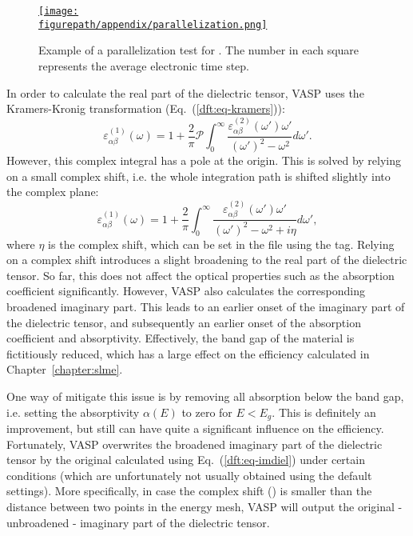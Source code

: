 \begin{refsection}
\begin{figure}[ht]
\centering
\href{https://www.youtube.com/watch?v=q8rcTvAoRzk}{
\texttt{[image: \\figurepath/appendix/parallelization.png]}
}
\caption{Example of a parallelization test for . The number in each 
square represents the average electronic time step.}
\label{appendix:fig-parallelization}
\end{figure}
 
\pagebreak[4]

In order to calculate the real part of the dielectric tensor, \gls{VASP} 
uses the Kramers-Kronig transformation (Eq.~(\ref{dft:eq-kramers})):
\begin{equation}
\varepsilon_{\alpha \beta}^{(1)} (\omega) = 1 + \frac{2}{\pi} \mathcal{P} 
\int_0^\infty \frac{\varepsilon_{\alpha \beta}^{(2)} 
(\omega')\omega'}{(\omega')^2 - \omega^2}d\omega'.
\end{equation} 
However, this complex integral has a pole at the origin. This is solved by 
relying on a small complex shift, i.e. the whole integration path is shifted 
slightly into the complex plane:
\begin{equation}
\varepsilon_{\alpha \beta}^{(1)} (\omega) = 1 + \frac{2}{\pi} 
\int_0^\infty \frac{\varepsilon_{\alpha \beta}^{(2)} 
(\omega')\omega'}{(\omega')^2 - \omega^2 + i\eta}d\omega', 
\end{equation} 
where $\eta$ is the complex shift, which can be set in the  
file using the   tag. Relying on a complex shift introduces 
a slight broadening to the real part of the dielectric tensor. So far, 
this does not affect the optical properties such as the absorption 
coefficient significantly. However, \gls{VASP} also calculates 
the corresponding broadened imaginary part. This leads to an earlier onset of 
the imaginary part of the dielectric tensor, and subsequently an earlier onset 
of the absorption coefficient and absorptivity. Effectively, the band gap of 
the material is fictitiously reduced, which has a large effect on the 
efficiency calculated in Chapter~\ref{chapter:slme}.

One way of mitigate this issue is by removing all absorption below the 
band gap, i.e. setting the absorptivity $\alpha(E)$ to zero for $E < E_g$. 
This is definitely an improvement, but still can have quite a significant 
influence on the efficiency. Fortunately, \gls{VASP} overwrites the 
broadened imaginary part of the dielectric tensor by the original calculated 
using Eq.~(\ref{dft:eq-imdiel}) under certain conditions (which are 
unfortunately not usually obtained using the default settings).  More 
specifically, in case the complex shift () is smaller than 
the distance between two points in the energy mesh, \gls{VASP} will 
output the original - unbroadened - imaginary part of the dielectric tensor.


\end{refsection}
